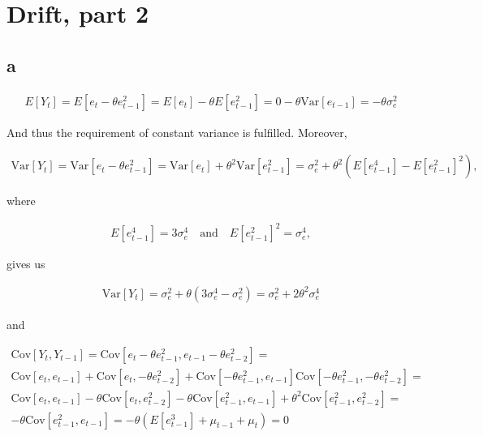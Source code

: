 \documentclass[]{book}
\begin{document}
\section{Drift, part 2}\label{drift-part-2}

\subsection*{a}\label{a-9}

\begin{gather*}
  E[Y_t] = E[e_t - \theta e_{t-1}^2] = E[e_t] - \theta E[e_{t-1}^2] = 0 - \theta \text{Var}[e_{t-1}] = -\theta \sigma_e^2
\end{gather*}

And thus the requirement of constant variance is fulfilled. Moreover,

\begin{gather*}
  \text{Var}[Y_t] = \text{Var}[e_t-\theta e_{t-1}^2] = \text{Var}[e_t] + \theta^2 \text{Var}[e_{t-1}^2] = \sigma_e^2 + \theta^2 (E[e_{t-1}^4] - E[e_{t-1}^2]^2),
\end{gather*}

where

\begin{gather*}
  E[e_{t-1}^4] = 3\sigma_e^4 \quad \text{and} \quad E[e_{t-1}^2 ]^2 = \sigma_e^4,
\end{gather*}

gives us

\begin{gather*}
  \text{Var}[Y_t] = \sigma_e^2 + \theta(3\sigma_e^4 - \sigma_e^2) = \sigma_e^2 + 2 \theta^2 \sigma_e^4
\end{gather*}

and

\begin{gather*}
  \text{Cov}[Y_t, Y_{t-1}] = \text{Cov}[e_t - \theta e_{t-1}^2, e_{t-1} - \theta e_{t-2}^2] = \\
  \text{Cov}[e_t, e_{t-1}] + \text{Cov}[e_t, - \theta e_{t-2}^2] + \text{Cov}[- \theta e_{t-1}^2, e_{t-1}]
    \text{Cov}[-\theta e_{t-1}^2, - \theta e_{t-2}^2] =\\
  \text{Cov}[e_t, e_{t-1}] - \theta \text{Cov}[e_t, e_{t-2}^2] - \theta \text{Cov}[e_{t-1}^2, e_{t-1}] +
    \theta^2 \text{Cov}[e_{t-1}^2, e_{t-2}^2] = \\
  -\theta \text{Cov}[e_{t-1}^2, e_{t-1}] = -\theta (E[e_{t-1}^3] + \mu_{t-1} + \mu_t) = 0
\end{gather*}
\end{document}
